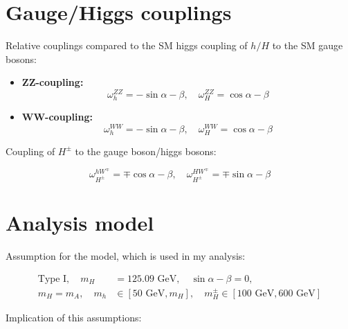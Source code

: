 \documentclass[12pt,oneside]{book}
\begin{document}
\section*{Gauge/Higgs couplings}

Relative couplings compared to the SM higgs coupling of $h/H$ to the SM gauge bosons:

\begin{itemize}
    \item[] \bfseries{ZZ-coupling}: 
        \begin{equation}
            \omega^{ZZ}_{h} = -\sin{\alpha-\beta}, \quad \omega^{ZZ}_{H} = \cos{\alpha-\beta}
        \end{equation}
    \item[] \bfseries{WW-coupling}:
        \begin{equation}
            \omega^{WW}_{h} = -\sin{\alpha-\beta}, \quad \omega^{WW}_{H} = \cos{\alpha-\beta}
        \end{equation}
\end{itemize}

Coupling of $H^{\pm}$ to the gauge boson/higgs bosons:

\begin{equation}
    \omega^{hW^{\mp}}_{H^{\pm}} = \mp \cos{\alpha-\beta}, \quad \omega^{HW^{\mp}}_{H^{\pm}} = \mp \sin{\alpha-\beta}
\end{equation}


\newpage

\section*{Analysis model}

Assumption for the model, which is used in my analysis:

\begin{align}
    \text{Type I}, \quad m_H &= 125.09 \text{ GeV}, \quad \sin{\alpha-\beta} = 0, \\
        m_H = m_A, \quad m_h &\in [50 \text{ GeV}, m_H], \quad m_H^{\pm} \in [100 \text{ GeV}, 600 \text{ GeV}] \nonumber
\end{align} 

Implication of this assumptions:
\end{document}
